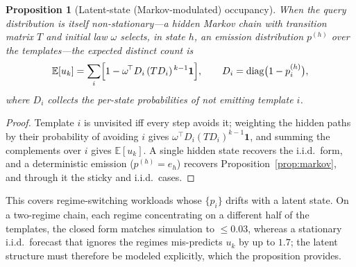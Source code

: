 \documentclass[sigconf,nonacm]{acmart}
\newcommand{\E}{\mathbb{E}}
\newtheorem{prop}{Proposition}
\begin{document}
\begin{prop}[Latent-state (Markov-modulated) occupancy]\label{prop:hmm}
When the query distribution is itself non-stationary---a hidden Markov chain with transition matrix $T$ and initial law $\omega$ selects, in state $h$, an emission distribution $p^{(h)}$ over the templates---the expected distinct count is
\[
\E[u_k]=\sum_i\Bigl[1-\omega^{\!\top} D_i\,(T D_i)^{\,k-1}\mathbf 1\Bigr],\qquad D_i=\mathrm{diag}\bigl(1-p^{(h)}_i\bigr),
\]
where $D_i$ collects the per-state probabilities of \emph{not} emitting template $i$.
\end{prop}
\begin{proof}
Template $i$ is unvisited iff every step avoids it; weighting the hidden paths by their probability of avoiding $i$ gives $\omega^{\!\top}D_i(TD_i)^{k-1}\mathbf 1$, and summing the complements over $i$ gives $\E[u_k]$. A single hidden state recovers the i.i.d.\ form, and a deterministic emission ($p^{(h)}{=}e_h$) recovers Proposition~\ref{prop:markov}, and through it the sticky and i.i.d.\ cases. \end{proof}
\noindent This covers regime-switching workloads whose $\{p_i\}$ drifts with a latent state. On a two-regime chain, each regime concentrating on a different half of the templates, the closed form matches simulation to $\le0.03$, whereas a stationary i.i.d.\ forecast that ignores the regimes mis-predicts $u_k$ by up to $1.7$; the latent structure must therefore be modeled explicitly, which the proposition provides.
\end{document}
